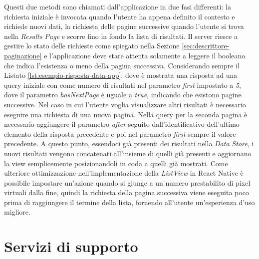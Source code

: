 Questi due metodi sono chiamati dall'applicazione in due fasi differenti: la richiesta iniziale è invocata quando l'utente ha appena definito il contesto e richiede nuovi dati, la richiesta delle pagine successive quando l'utente si trova nella \emph{Results Page} e scorre fino in fondo la lista di risultati. 
Il server riesce a gestire lo stato delle richieste come spiegato nella Sezione \ref{sec:descrittore-paginazione} e l'applicazione deve stare attenta solamente a leggere il booleano che indica l'esistenza o meno della pagina successiva.
Considerando sempre il Listato \ref{lst:esempio-risposta-data-app}, dove è mostrata una risposta ad una query iniziale con come numero di risultati nel parametro \emph{first} impostato a \emph{5}, dove il parametro \emph{hasNextPage} è uguale a \emph{true}, indicando che esistono pagine successive. Nel caso in cui l'utente voglia visualizzare altri risultati è necessario eseguire una richiesta di una nuova pagina. Nella query per la seconda pagina è necessario aggiungere il parametro \emph{after} seguito dall'identificativo dell'ultimo elemento della risposta precedente e poi nel parametro \emph{first} sempre il valore precedente. A questo punto, essendoci già presenti dei risultati nella \emph{Data Store}, i nuovi risultati vengono concatenati all'insieme di quelli già presenti e aggiornano la view semplicemente posizionandoli in coda a quelli già mostrati. Come ulteriore ottimizzazione nell'implementazione della \emph{ListView} in React Native è possibile impostare un'azione quando si giunge a un numero prestabilito di pixel virtuali dalla fine, quindi la richiesta della pagina successiva viene eseguita poco prima di raggiungere il termine della lista, fornendo all'utente un'esperienza d'uso migliore.

\section{Servizi di supporto}\label{sec:servizi-supporto-app}

